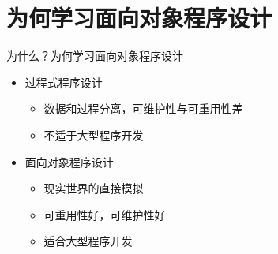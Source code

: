 \section[为什么？]{为何学习面向对象程序设计}\label{sec:chap01-sec03}
\begin{frame}{为什么？}{为何学习面向对象程序设计}
  \stretchon
  \begin{itemize}
  \item 过程式程序设计
    \begin{itemize}
    \item 数据和过程分离，可维护性与可重用性差
    \item 不适于大型程序开发
    \end{itemize}
  \item 面向对象程序设计
    \begin{itemize}
    \item 现实世界的直接模拟
    \item 可重用性好，可维护性好
    \item 适合大型程序开发
    \end{itemize}
  \end{itemize}
  \stretchoff
\end{frame}

